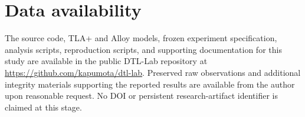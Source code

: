 \section*{Data availability}
The source code, TLA+ and Alloy models, frozen experiment specification,
analysis scripts, reproduction scripts, and supporting documentation for this
study are available in the public DTL-Lab repository at
\url{https://github.com/kapumota/dtl-lab}.
Preserved raw observations and additional integrity materials supporting the
reported results are available from the author upon reasonable request.
No DOI or persistent research-artifact identifier is claimed at this stage.
